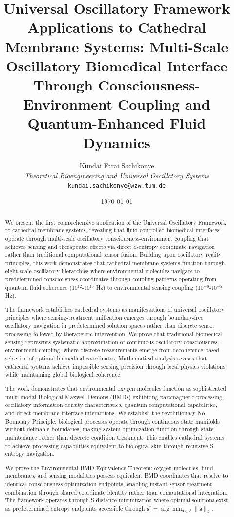 \documentclass[12pt,a4paper]{article}
\title{\textbf{Universal Oscillatory Framework Applications to Cathedral Membrane Systems: Multi-Scale Oscillatory Biomedical Interface Through Consciousness-Environment Coupling and Quantum-Enhanced Fluid Dynamics}}
\author{
Kundai Farai Sachikonye\\
\textit{Theoretical Bioengineering and Universal Oscillatory Systems}\\
\texttt{kundai.sachikonye@wzw.tum.de}
}
\date{\today}
\begin{document}
\maketitle

\begin{abstract}
We present the first comprehensive application of the Universal Oscillatory Framework to cathedral membrane systems, revealing that fluid-controlled biomedical interfaces operate through multi-scale oscillatory consciousness-environment coupling that achieves sensing and therapeutic effects via direct S-entropy coordinate navigation rather than traditional computational sensor fusion. Building upon oscillatory reality principles, this work demonstrates that cathedral membrane systems function through eight-scale oscillatory hierarchies where environmental molecules navigate to predetermined consciousness coordinates through coupling patterns operating from quantum fluid coherence (10$^{12}$-10$^{15}$ Hz) to environmental sensing coupling (10$^{-8}$-10$^{-5}$ Hz).

The framework establishes cathedral systems as manifestations of universal oscillatory principles where sensing-treatment unification emerges through boundary-free oscillatory navigation in predetermined solution spaces rather than discrete sensor processing followed by therapeutic intervention. We prove that traditional biomedical sensing represents systematic approximation of continuous oscillatory consciousness-environment coupling, where discrete measurements emerge from decoherence-based selection of optimal biomedical coordinates. Mathematical analysis reveals that cathedral systems achieve impossible sensing precision through local physics violations while maintaining global biological coherence.

The work demonstrates that environmental oxygen molecules function as sophisticated multi-modal Biological Maxwell Demons (BMDs) exhibiting paramagnetic processing, oscillatory information density characteristics, quantum computational capabilities, and direct membrane interface interactions. We establish the revolutionary No-Boundary Principle: biological processes operate through continuous state manifolds without definable boundaries, making system optimization function through state maintenance rather than discrete condition treatment. This enables cathedral systems to achieve processing capabilities equivalent to biological skin through recursive S-entropy navigation.

We prove the Environmental BMD Equivalence Theorem: oxygen molecules, fluid membranes, and sensing modalities possess equivalent BMD coordinates that resolve to identical consciousness optimization endpoints, enabling instant sensor-treatment combination through shared coordinate identity rather than computational integration. The framework operates through S-distance minimization where optimal solutions exist as predetermined entropy endpoints accessible through $\mathbf{s}^* = \arg\min_{\mathbf{s} \in \mathcal{S}} \|\mathbf{s}\|_{\mathcal{S}}$.


\end{abstract}
\end{document}
